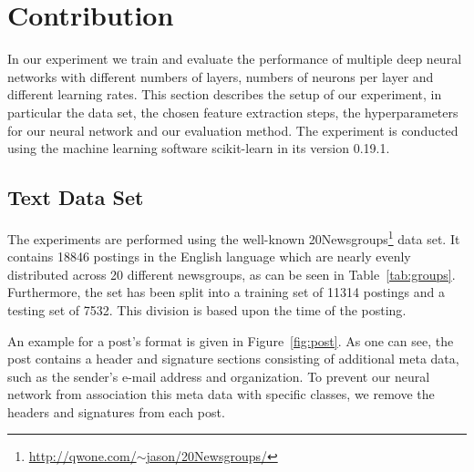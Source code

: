 \documentclass[sigconf]{acmart}
\begin{document}
\section{Contribution}

In our experiment we train and evaluate the performance of multiple deep neural networks with different numbers of layers, numbers of neurons per layer and different learning rates.
This section describes the setup of our experiment, in particular the data set, the chosen feature extraction steps, the hyperparameters for our neural network and our evaluation method. The experiment is conducted using the machine learning software scikit-learn\cite{scikit-learn} in its version 0.19.1.

\subsection{Text Data Set}

The experiments are performed using the well-known 20Newsgroups\footnote{\href{http://qwone.com/~jason/20Newsgroups/}{http://qwone.com/$\sim$jason/20Newsgroups/}} data set. It contains 18846 postings in the English language which are nearly evenly distributed across 20 different newsgroups, as can be seen in Table~\ref{tab:groups}. Furthermore, the set has been split into a training set of 11314 postings and a testing set of 7532. This division is based upon the time of the posting\cite{sklearn-newsgroup}.

An example for a post's format is given in Figure~\ref{fig:post}. As one can see, the post contains a header and signature sections consisting of additional meta data, such as the sender's e-mail address and organization. To prevent our neural network from association this meta data with specific classes, we remove the headers and signatures from each post.
\end{document}
